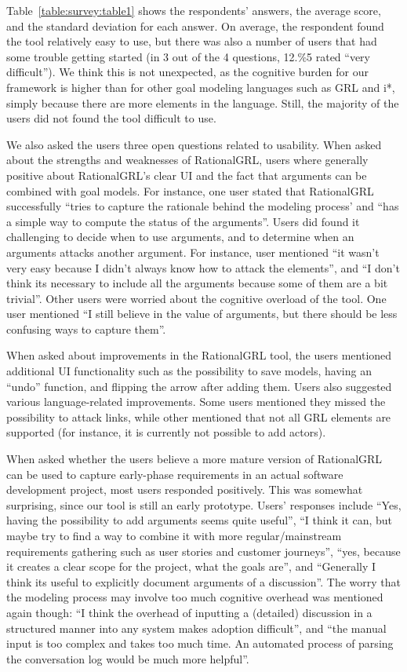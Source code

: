 Table~\ref{table:survey:table1} shows the respondents' answers, the average score, and the standard deviation for each answer. On average, the respondent found the tool relatively easy to use, but there was also a number of users that had some trouble getting started (in 3 out of the 4 questions, 12.\%5 rated ``very difficult''). We think this is not unexpected, as the cognitive burden for our framework is higher than for other goal modeling languages such as GRL and i*, simply because there are more elements in the language. Still, the majority of the users did not found the tool difficult to use.

We also asked the users three open questions related to usability. When asked about the strengths and weaknesses of RationalGRL, users where generally positive about RationalGRL's clear UI and the fact that arguments can be combined with goal models. For instance, one user stated that RationalGRL successfully ``tries to capture the rationale behind the modeling process' and ``has a simple way to compute the status of the arguments''. Users did found it challenging to decide when to use arguments, and to determine when an arguments attacks another argument. For instance, user mentioned ``it wasn't very easy because I didn't always know how to attack the elements'', and ``I don't think its necessary to include all the arguments because some of them are a bit trivial''. Other users were worried about the cognitive overload of the tool. One user mentioned ``I still believe in the value of arguments, but there should be less confusing ways to capture them''. 

When asked about improvements in the RationalGRL tool, the users mentioned additional UI functionality such as the possibility to save models, having an ``undo'' function, and flipping the arrow after adding them. Users also suggested various language-related improvements. Some users mentioned they missed the possibility to attack links, while other mentioned that not all GRL elements are supported (for instance, it is currently not possible to add actors).

When asked whether the users believe a more mature version of RationalGRL can be used to capture early-phase requirements in an actual software development project, most users responded positively. This was somewhat surprising, since our tool is still an early prototype. Users' responses include ``Yes, having the possibility to add arguments seems quite useful'', ``I think it can, but maybe try to find a way to combine it with more regular/mainstream requirements gathering such as user stories and customer journeys'', ``yes, because it creates a clear scope for the project, what the goals are'', and ``Generally I think its useful to explicitly document arguments of a discussion''. The worry that the modeling process may involve too much cognitive overhead was mentioned again though: ``I think the overhead of inputting a (detailed) discussion in a structured manner into any system makes adoption difficult'', and ``the manual input is too complex and takes too much time. An automated process of parsing the conversation log would be much more helpful''. 

